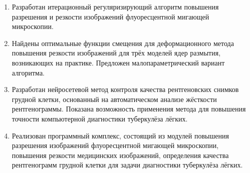 \begin{enumerate}[beginpenalty=10000]
	\item Разработан итерационный регуляризирующий алгоритм повышения разрешения и резкости изображений флуоресцентной мигающей микроскопии.
	
	\item Найдены оптимальные функции смещения для деформационного метода повышения резкости изображений для трёх моделей ядер размытия, возникающих на практике. Предложен малопараметрический вариант алгоритма.
	
	\item Разработан нейросетевой метод контроля качества рентгеновских снимков грудной клетки, основанный на автоматическом анализе жёсткости рентгенограммы. Показана возможность применения метода для повышения точности компьютерной диагностики туберкулёза лёгких.
	
	\item Реализован программный комплекс, состоящий из модулей повышения разрешения изображений флуоресцентной мигающей микроскопии, повышения резкости медицинских изображений, определения качества рентгенограмм грудной клетки для задачи диагностики туберкулёза лёгких.
\end{enumerate}

